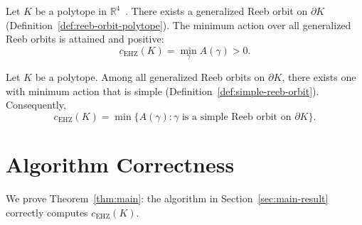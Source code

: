 \begin{theorem}\label{thm:orbit-existence-polytope}
Let $K$ be a polytope in $\mathbb{R}^4$~\cite{AAO2014}.
There exists a generalized Reeb orbit on $\partial K$
(Definition~\ref{def:reeb-orbit-polytope}).
The minimum action over all generalized Reeb orbits is attained
and positive:
\[
  c_{\mathrm{EHZ}}(K) = \min_{\gamma} A(\gamma) > 0.
\]
\end{theorem}

\begin{theorem}\label{thm:simple-minimizer}
Let $K$ be a polytope.
Among all generalized Reeb orbits on $\partial K$, there exists one
with minimum action that is simple
(Definition~\ref{def:simple-reeb-orbit}).
Consequently,
\[
  c_{\mathrm{EHZ}}(K) = \min\bigl\{ A(\gamma) :
  \gamma \text{ is a simple Reeb orbit on } \partial K \bigr\}.
\]
\end{theorem}




\section{Algorithm Correctness}\label{sec:algorithm-correctness}

We prove Theorem~\ref{thm:main}: the algorithm in
Section~\ref{sec:main-result} correctly computes
$c_{\mathrm{EHZ}}(K)$.

